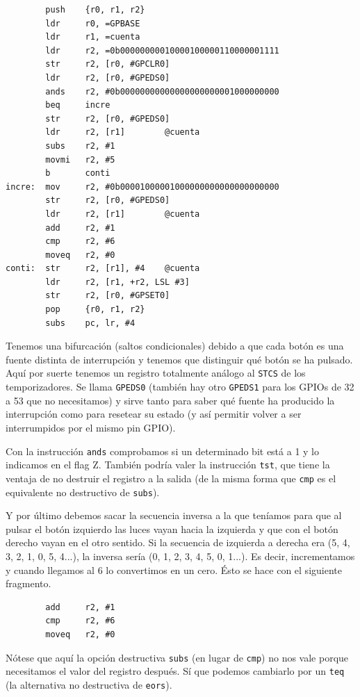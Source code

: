 \begin{lstlisting}
        push    {r0, r1, r2}
        ldr     r0, =GPBASE
        ldr     r1, =cuenta
        ldr     r2, =0b00000000010000100000110000001111
        str     r2, [r0, #GPCLR0]
        ldr     r2, [r0, #GPEDS0]
        ands    r2, #0b00000000000000000000001000000000
        beq     incre
        str     r2, [r0, #GPEDS0]
        ldr     r2, [r1]        @cuenta
        subs    r2, #1
        movmi   r2, #5
        b       conti
incre:  mov     r2, #0b00001000001000000000000000000000
        str     r2, [r0, #GPEDS0]
        ldr     r2, [r1]        @cuenta
        add     r2, #1
        cmp     r2, #6
        moveq   r2, #0
conti:  str     r2, [r1], #4    @cuenta
        ldr     r2, [r1, +r2, LSL #3]
        str     r2, [r0, #GPSET0]
        pop     {r0, r1, r2}
        subs    pc, lr, #4
\end{lstlisting}

Tenemos una bifurcación (saltos condicionales) debido a que cada botón es una fuente distinta
de interrupción y tenemos que distinguir qué botón se ha pulsado. Aquí por suerte tenemos
un registro totalmente análogo al {\tt STCS} de los temporizadores. Se llama {\tt GPEDS0}
(también hay otro {\tt GPEDS1} para los GPIOs de 32 a 53 que no necesitamos) y sirve tanto
para saber qué fuente ha producido la interrupción como para resetear su estado (y así permitir
volver a ser interrumpidos por el mismo pin GPIO).

Con la instrucción {\tt ands} comprobamos si un determinado bit está a 1 y lo indicamos en el
flag Z. También podría valer la instrucción {\tt tst}, que tiene la ventaja de no destruir
el registro a la salida (de la misma forma que {\tt cmp} es el equivalente no destructivo de
{\tt subs}).

Y por último debemos sacar la secuencia inversa a la que teníamos para que al pulsar el
botón izquierdo las luces vayan hacia la izquierda y que con el botón derecho vayan en el otro
sentido. Si la secuencia de izquierda a derecha era  (5, 4, 3, 2, 1, 0, 5, 4...), la
inversa sería (0, 1, 2, 3, 4, 5, 0, 1...). Es decir, incrementamos y cuando llegamos al 6
lo convertimos en un cero. Ésto se hace con el siguiente fragmento.

\begin{lstlisting}
        add     r2, #1
        cmp     r2, #6
        moveq   r2, #0
\end{lstlisting}

Nótese que aquí la opción destructiva {\tt subs} (en lugar de {\tt cmp}) no nos vale porque
necesitamos el valor del registro después. Sí que podemos cambiarlo por un {\tt teq} (la
alternativa no destructiva de {\tt eors}).

